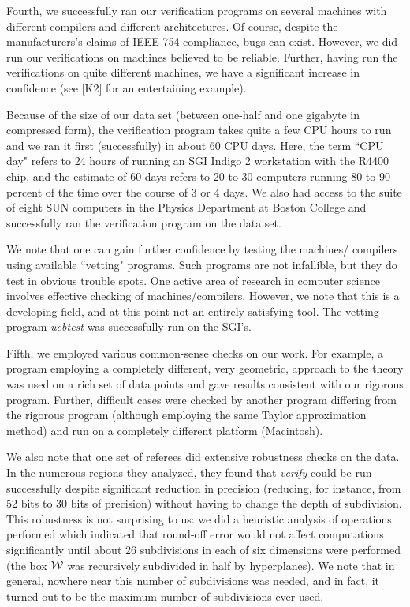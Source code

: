 Fourth, we successfully ran our verification programs on several machines 
with different compilers and different architectures.  
Of course, despite the manufacturers's claims of IEEE-754 compliance,  bugs 
can exist.  However, we did run our verifications on machines believed to be 
reliable.  Further, having run the verifications on quite different machines, 
we have a significant increase in confidence
(see [K2] for an entertaining example). 

Because of the size of our data set (between one-half and one gigabyte in 
compressed form), the verification program takes quite a few CPU hours to 
run and we ran it first (successfully)
in about 60 CPU days.   Here, the term ``CPU day" refers to 24 hours of 
running an SGI Indigo 2 workstation with the R4400 chip, and the estimate 
of 60 days refers to 20 to 30 computers running 80 to 90 percent of the time 
over the course of 3 or 4 days.  We also had access to the suite of eight SUN 
computers in the Physics Department at Boston College and successfully ran 
the verification program on the data set.

We note that
one can gain further confidence by testing the machines/ compilers using 
available ``vetting" programs. Such programs are not infallible, but they do 
test in obvious trouble spots.  One active area of research in computer 
science involves effective checking of machines/compilers.
However, we note that this is a developing field, and at this point not an 
entirely satisfying tool.  The vetting program {\it ucbtest} was successfully 
run on the SGI's. 

Fifth,  we employed various common-sense checks on our work.  For 
example, a program employing  a completely different, very geometric, 
approach to the theory was used on a rich set of data points and gave results 
consistent with our rigorous program.  Further, difficult cases were checked 
by another program differing from the rigorous program (although 
employing the same Taylor approximation method) and run on a 
completely different platform (Macintosh). 
\pagegoal=50pc

We also note that one set of referees did extensive 
robustness checks on the data.  
In the numerous regions they analyzed, they found that {\it verify} 
could be run successfully despite significant reduction in precision
(reducing, for instance, from 52 bits to 30 bits of precision)
without having to change the depth of subdivision.
This robustness is not surprising to us: 
we did a heuristic analysis of operations 
performed which indicated that round-off error would not affect 
computations  significantly until about 26 subdivisions in each of six
dimensions were performed (the box ${\cal W}$ was 
recursively subdivided in half by hyperplanes).  
We note that in general, nowhere near this number of 
subdivisions was needed, and in fact, it turned out to be  the maximum 
number of subdivisions ever used.

